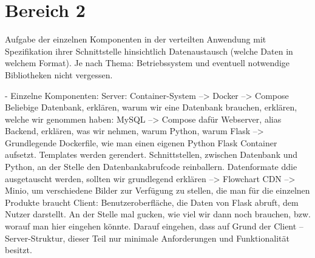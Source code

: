 \section{Bereich 2}

Aufgabe der einzelnen Komponenten in der verteilten Anwendung mit Spezifikation ihrer Schnittstelle hinsichtlich Datenaustausch (welche Daten in welchem Format).
Je nach Thema: Betriebssystem und eventuell notwendige Bibliotheken nicht vergessen.

- Einzelne Komponenten:
Server:
    Container-System --> Docker --> Compose
    Beliebige Datenbank, erklären, warum wir eine Datenbank brauchen, erklären, welche wir genommen haben: MySQL --> Compose dafür
    Webserver, alias Backend, erklären, was wir nehmen, warum Python, warum Flask --> Grundlegende Dockerfile, wie man einen eigenen Python Flask Container aufsetzt.
    Templates werden gerendert.
    Schnittstellen, zwischen Datenbank und Python, an der Stelle den Datenbankabrufcode reinballern.
    Datenformate ddie ausgetauscht werden, sollten wir grundlegend erklären --> Flowchart
    CDN --> Minio, um verschiedene Bilder zur Verfügung zu stellen, die man für die einzelnen Produkte braucht
Client:
    Benutzeroberfläche, die Daten von Flask abruft, dem Nutzer darstellt.
    An der Stelle mal gucken, wie viel wir dann noch brauchen, bzw. worauf man hier eingehen könnte.
    Darauf eingehen, dass auf Grund der Client -- Server-Struktur, dieser Teil nur minimale Anforderungen und Funktionalität besitzt.